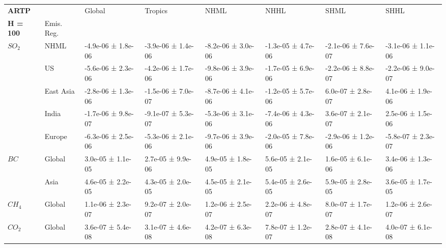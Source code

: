 \documentclass[preview]{standalone}
\newcommand{\nm}{\phantom{-}}
\begin{document}
    \tiny
    \begin{minipage}{\textwidth}
    	\setlength\tabcolsep{5pt}
    \begin{tabular}{llllllll}
\toprule
\textbf{ARTP}       &        &               Global &              Tropics &                 NHML &                 NHHL &                 SHML &                 SHHL \\
\textbf{H = 100}   & Emis. Reg. &                      &                      &                      &                      &                      &                      \\
\midrule
$SO_2$ & NHML &  -4.9e-06 ±  1.8e-06 &  -3.9e-06 ±  1.4e-06 &  -8.2e-06 ±  3.0e-06 &  -1.3e-05 ±  4.7e-06 &  -2.1e-06 ±  7.6e-07 &  -3.1e-06 ±  1.1e-06 \\
       & US &  -5.6e-06 ±  2.3e-06 &  -4.2e-06 ±  1.7e-06 &  -9.8e-06 ±  3.9e-06 &  -1.7e-05 ±  6.9e-06 &  -2.2e-06 ±  8.8e-07 &  -2.2e-06 ±  9.0e-07 \\
       & East Asia &  -2.8e-06 ±  1.3e-06 &  -1.5e-06 ±  7.0e-07 &  -8.7e-06 ±  4.1e-06 &  -1.2e-05 ±  5.7e-06 &   \nm6.0e-07 ±  2.8e-07 &   \nm4.1e-06 ±  1.9e-06 \\
       & India &  -1.7e-06 ±  9.8e-07 &  -9.1e-07 ±  5.3e-07 &  -5.3e-06 ±  3.1e-06 &  -7.4e-06 ±  4.3e-06 &   \nm3.6e-07 ±  2.1e-07 &   \nm2.5e-06 ±  1.5e-06 \\
       & Europe &  -6.3e-06 ±  2.5e-06 &  -5.3e-06 ±  2.1e-06 &  -9.7e-06 ±  3.9e-06 &  -2.0e-05 ±  7.8e-06 &  -2.9e-06 ±  1.2e-06 &  -5.8e-07 ±  2.3e-07 \\
\cmidrule(lr){1-8}
$BC$ & Global &   \nm3.0e-05 ±  1.1e-05 &   \nm2.7e-05 ±  9.9e-06 &   \nm4.9e-05 ±  1.8e-05 &   \nm5.6e-05 ±  2.1e-05 &   \nm1.6e-05 ±  6.1e-06 &   \nm3.4e-06 ±  1.3e-06 \\
       & Asia &   \nm4.6e-05 ±  2.2e-05 &   \nm4.3e-05 ±  2.0e-05 &   \nm4.5e-05 ±  2.1e-05 &   \nm5.4e-05 ±  2.6e-05 &   \nm5.9e-05 ±  2.8e-05 &   \nm3.6e-05 ±  1.7e-05 \\
\cmidrule(lr){1-8}
$CH_4$ & Global &   \nm1.1e-06 ±  2.3e-07 &   \nm9.2e-07 ±  2.0e-07 &   \nm1.2e-06 ±  2.5e-07 &  \nm2.2e-06 ±  4.8e-07 &   \nm8.0e-07 ±  1.7e-07 &   \nm1.2e-06 ±  2.6e-07 \\
\cmidrule(lr){1-8}
$CO_2$ & Global &   \nm3.6e-07 ±  5.4e-08 &   \nm3.1e-07 ±  4.6e-08 &   \nm4.2e-07 ±  6.3e-08 &   \nm7.8e-07 ±  1.2e-07 &   \nm2.8e-07 ±  4.1e-08 &   \nm4.0e-07 ±  6.1e-08 \\
\bottomrule
\end{tabular}

    \end{minipage}
    
\end{document}
